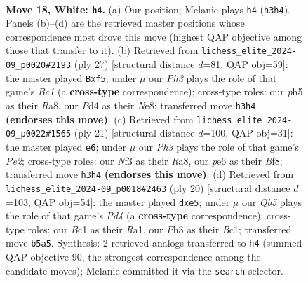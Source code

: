 \documentclass[11pt]{article}
\begin{document}
\clearpage

\begin{figure}[p]\centering
\begin{subfigure}{0.46\textwidth}\centering
\resizebox{\linewidth}{!}{%
\newchessgame
\chessboard[
  setfen={rnb1rqk1/pp3pb1/4pnp1/1Q1p3p/P2P4/1B3NPP/RPP2P1K/1NB1R3 w - - 4 18},
  showmover=false,
  pgfstyle=straightmove, color=movearrow, markmove={h3-h4}
]}
\caption{}
\end{subfigure}\hfill
\begin{subfigure}{0.46\textwidth}\centering
\resizebox{\linewidth}{!}{%
\newchessgame
\chessboard[
  setfen={r1b1nrk1/1pp3bp/3p4/p1nPpP2/6Bq/1PN1B2P/P1PN1P2/R2QK2R b KQ - 2 14},
  showmover=false,
  pgfstyle=straightmove, color=movearrow, markmove={c8-f5}
]}
\caption{}
\end{subfigure}
\\[4pt]
\begin{subfigure}{0.46\textwidth}\centering
\resizebox{\linewidth}{!}{%
\newchessgame
\chessboard[
  setfen={r3kb1r/pp2pppp/1nnq4/7b/2p1B3/2P2N1P/PP1P1PP1/RNBQ1RK1 b kq - 2 11},
  showmover=false,
  pgfstyle=straightmove, color=movearrow, markmove={e7-e6}
]}
\caption{}
\end{subfigure}\hfill
\begin{subfigure}{0.46\textwidth}\centering
\resizebox{\linewidth}{!}{%
\newchessgame
\chessboard[
  setfen={r2qkb1r/pb3ppp/2p1pn2/1p2n3/3P4/1QN3P1/P3PPBP/R1B2RK1 w kq - 0 11},
  showmover=false,
  pgfstyle=straightmove, color=movearrow, markmove={d4-e5}
]}
\caption{}
\end{subfigure}
\caption{\textbf{Move 18, White: \texttt{h4}.} (a) Our position; Melanie plays \texttt{h4} (\texttt{h3h4}). Panels (b)--(d) are the retrieved master positions whose correspondence most drove this move (highest QAP objective among those that transfer to it). (b) Retrieved from \texttt{lichess\_elite\_2024-09\_p0020\#2193} (ply 27) [structural distance $d$=81, QAP obj=59]: the master played \texttt{Bxf5}; under $\mu$ our \emph{Ph3} plays the role of that game's \emph{Bc1} (a \textbf{cross-type} correspondence); cross-type roles: our \emph{p}h5 as their \emph{R}a8, our \emph{P}d4 as their \emph{N}e8; transferred move \texttt{h3h4} \textbf{(endorses this move)}. (c) Retrieved from \texttt{lichess\_elite\_2024-09\_p0022\#1565} (ply 21) [structural distance $d$=100, QAP obj=31]: the master played \texttt{e6}; under $\mu$ our \emph{Ph3} plays the role of that game's \emph{Pe2}; cross-type roles: our \emph{N}f3 as their \emph{R}a8, our \emph{p}e6 as their \emph{B}f8; transferred move \texttt{h3h4} \textbf{(endorses this move)}. (d) Retrieved from \texttt{lichess\_elite\_2024-09\_p0018\#2463} (ply 20) [structural distance $d$=103, QAP obj=54]: the master played \texttt{dxe5}; under $\mu$ our \emph{Qb5} plays the role of that game's \emph{Pd4} (a \textbf{cross-type} correspondence); cross-type roles: our \emph{B}c1 as their \emph{R}a1, our \emph{P}h3 as their \emph{B}c1; transferred move \texttt{b5a5}. Synthesis: 2 retrieved analogs transferred to \texttt{h4} (summed QAP objective 90, the strongest correspondence among the candidate moves); Melanie committed it via the \texttt{search} selector.}
\label{fig:thought-m34}
\end{figure}
\end{document}

